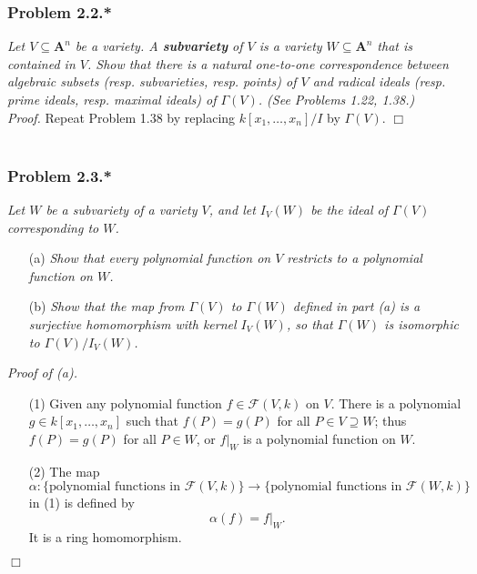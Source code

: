 \documentclass{article}
\begin{document}



\subsubsection*{Problem 2.2.*}
\emph{Let $V \subseteq \mathbf{A}^n$ be a variety.
A \textbf{subvariety} of $V$ is a variety $W \subseteq \mathbf{A}^n$ that is contained in $V$.
Show that there is a natural one-to-one correspondence between
algebraic subsets (resp. subvarieties, resp. points) of $V$
and radical ideals (resp. prime ideals, resp. maximal ideals) of $\Gamma(V)$.
(See Problems 1.22, 1.38.)} \\



\emph{Proof.}
Repeat Problem 1.38
by replacing $k[x_1,\ldots,x_n]/I$ by $\Gamma(V)$.
$\Box$ \\\\






\subsubsection*{Problem 2.3.*}
\emph{Let $W$ be a subvariety of a variety $V$,
and let $I_V(W)$ be the ideal of $\Gamma(V)$ corresponding to $W$.}
\begin{enumerate}
\item[(a)]
  \emph{Show that every polynomial function on $V$ restricts to a polynomial function on $W$.}

\item[(b)]
  \emph{Show that the map from $\Gamma(V)$ to $\Gamma(W)$ defined in part (a)
  is a surjective homomorphism with kernel $I_V(W)$,
  so that $\Gamma(W)$ is isomorphic to $\Gamma(V)/I_V(W)$.} \\
\end{enumerate}



\emph{Proof of (a).}
\begin{enumerate}
\item[(1)]
  Given any polynomial function $f \in \mathscr{F}(V,k)$ on $V$.
  There is a polynomial $g \in k[x_1,\ldots,x_n]$
  such that $f(P) = g(P)$ for all $P \in V \supseteq W$; thus $f(P) = g(P)$ for all $P \in W$,
  or $f|_W$ is a polynomial function on $W$.

\item[(2)]
  The map $\alpha: \{ \text{polynomial functions in $\mathscr{F}(V,k)$} \}
  \to \{ \text{polynomial functions in $\mathscr{F}(W,k)$} \}$ in (1) is defined by
  \[
    \alpha(f) = f|_{W}.
  \]
  It is a ring homomorphism.
\end{enumerate}
$\Box$ \\
\end{document}

